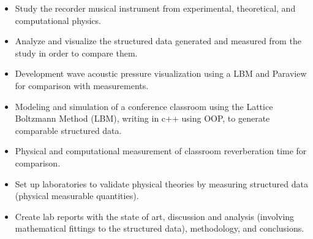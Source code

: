 \documentclass[10pt,letter,ragged2e,withhyper]{altacv}
\begin{document}
\begin{paracol}{2}
\divider

\begin{itemize}
\item Study the recorder musical instrument from experimental, theoretical, and computational physics.
\item Analyze and visualize the structured data generated and measured from the study in order to compare them.
\item Development wave acoustic pressure visualization using a LBM and Paraview for comparison with measurements.

\end{itemize}

\divider

\begin{itemize}
\item Modeling and simulation of a conference classroom using the Lattice Boltzmann Method (LBM), writing in c++ using OOP, to generate comparable structured data.
\item Physical and computational measurement of classroom reverberation time for comparison.
\end{itemize}

\divider

\begin{itemize}
\item Set up laboratories to validate physical theories by measuring structured data (physical measurable quantities).
\item Create lab reports with the state of art, discussion and analysis (involving mathematical fittings to the structured data), methodology, and conclusions.
\end{itemize}






\end{paracol}
\end{document}
